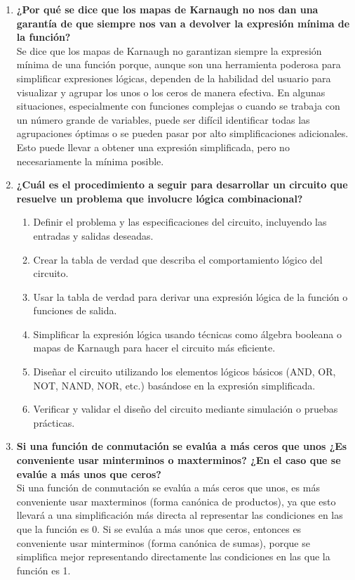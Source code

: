 \documentclass{article}
\begin{document}
{\begin{enumerate}
    \item \textbf{¿Por qué se dice que los mapas de Karnaugh no nos dan una garantía de que siempre nos van a devolver la expresión mínima de la función?} \\
    Se dice que los mapas de Karnaugh no garantizan siempre la expresión mínima de una función porque, aunque son una herramienta poderosa para simplificar expresiones lógicas, dependen de la habilidad del usuario para visualizar y agrupar los unos o los ceros de manera efectiva. En algunas situaciones, especialmente con funciones complejas o cuando se trabaja con un número grande de variables, puede ser difícil identificar todas las agrupaciones óptimas o se pueden pasar por alto simplificaciones adicionales. Esto puede llevar a obtener una expresión simplificada, pero no necesariamente la mínima posible.

    \item \textbf{¿Cuál es el procedimiento a seguir para desarrollar un circuito que resuelve un problema que involucre lógica combinacional?}
    \begin{enumerate}
        \item Definir el problema y las especificaciones del circuito, incluyendo las entradas y salidas deseadas.
        \item Crear la tabla de verdad que describa el comportamiento lógico del circuito.
        \item Usar la tabla de verdad para derivar una expresión lógica de la función o funciones de salida.
        \item Simplificar la expresión lógica usando técnicas como álgebra booleana o mapas de Karnaugh para hacer el circuito más eficiente.
        \item Diseñar el circuito utilizando los elementos lógicos básicos (AND, OR, NOT, NAND, NOR, etc.) basándose en la expresión simplificada.
        \item Verificar y validar el diseño del circuito mediante simulación o pruebas prácticas.
    \end{enumerate}

    \item \textbf{Si una función de conmutación se evalúa a más ceros que unos ¿Es conveniente usar minterminos o maxterminos? ¿En el caso que se evalúe a más unos que ceros?} \\
    Si una función de conmutación se evalúa a más ceros que unos, es más conveniente usar maxterminos (forma canónica de productos), ya que esto llevará a una simplificación más directa al representar las condiciones en las que la función es 0.
    Si se evalúa a más unos que ceros, entonces es conveniente usar minterminos (forma canónica de sumas), porque se simplifica mejor representando directamente las condiciones en las que la función es 1.


\end{enumerate}}
\end{document}
